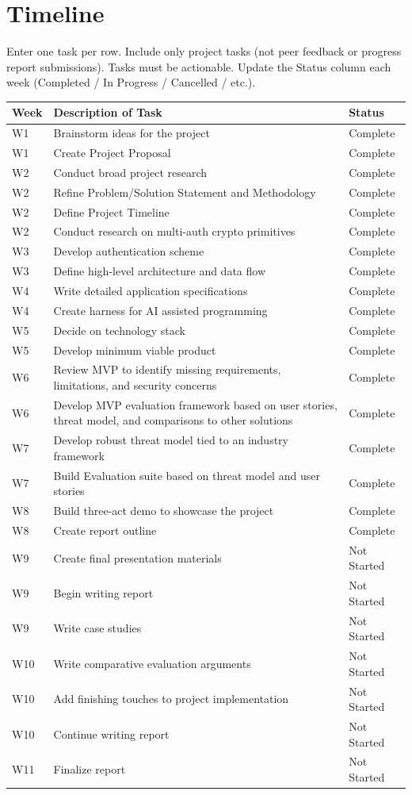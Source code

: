 \documentclass[12pt]{article}
\newcommand{\tlrow}[3]{#1 & #2 & #3 \\}
\begin{document}
\section*{Timeline}

{\small Enter one task per row. Include only project tasks (not peer feedback
or progress report submissions). Tasks must be actionable. Update the Status
column each week (Completed / In Progress / Cancelled / etc.).}

\vspace{0.5em}
\begin{tabularx}{\linewidth}{@{} l X l @{}}
  \toprule
  \textbf{Week} & \textbf{Description of Task} & \textbf{Status} \\
  \midrule
  \tlrow{W1}  {Brainstorm ideas for the project} {Complete}
  \tlrow{W1}  {Create Project Proposal} {Complete}
  \tlrow{W2}  {Conduct broad project research} {Complete}
  \tlrow{W2}  {Refine Problem/Solution Statement and Methodology} {Complete}
  \tlrow{W2}  {Define Project Timeline} {Complete}
  \tlrow{W2}  {Conduct research on multi-auth crypto primitives} {Complete}
  \tlrow{W3}  {Develop authentication scheme} {Complete}
  \tlrow{W3}  {Define high-level architecture and data flow} {Complete}
  \tlrow{W4}  {Write detailed application specifications} {Complete}
  \tlrow{W4}  {Create harness for AI assisted programming} {Complete}
  \tlrow{W5}  {Decide on technology stack} {Complete}
  \tlrow{W5}  {Develop minimum viable product} {Complete}
  \tlrow{W6}  {Review MVP to identify missing requirements, limitations, and security concerns} {Complete}
  \tlrow{W6}  {Develop MVP evaluation framework based on user stories, threat model, and comparisons to other solutions} {Complete}
  \tlrow{W7}  {Develop robust threat model tied to an industry framework} {Complete}
  \tlrow{W7}  {Build Evaluation suite based on threat model and user stories} {Complete}
  \tlrow{W8}  {Build three-act demo to showcase the project} {Complete}
  \tlrow{W8}  {Create report outline} {Complete}
  \tlrow{W9} {Create final presentation materials} {Not Started}
  \tlrow{W9}  {Begin writing report} {Not Started}
  \tlrow{W9}  {Write case studies} {Not Started}
  \tlrow{W10}  {Write comparative evaluation arguments} {Not Started}
  \tlrow{W10} {Add finishing touches to project implementation} {Not Started}
  \tlrow{W10} {Continue writing report} {Not Started}
  \tlrow{W11} {Finalize report} {Not Started}
  \bottomrule
\end{tabularx}
\end{document}
